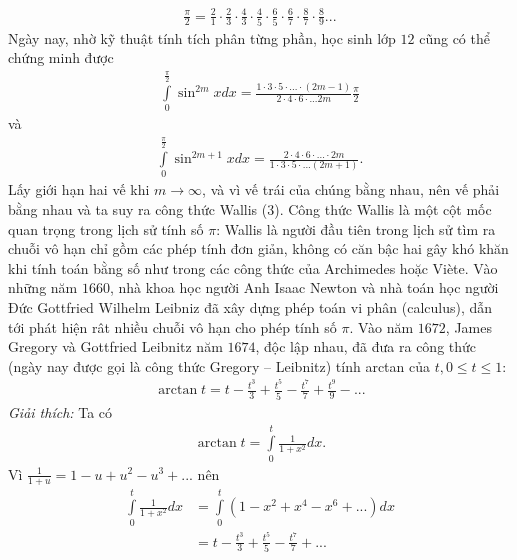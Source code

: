 \begin{multicols}{2}
	\begin{align*}
		\frac{\pi }{2} = \frac{2}{1} \cdot \frac{2}{3} \cdot \frac{4}{3} \cdot \frac{4}{5} \cdot \frac{6}{5} \cdot \frac{6}{7} \cdot \frac{8}{7} \cdot \frac{8}{9}... \tag{$3$}
	\end{align*}
	Ngày nay, nhờ kỹ thuật tính tích phân từng phần, học sinh lớp $12$ cũng có thể chứng minh được 
	\begin{align*}
		\int\limits_0^{\frac{\pi }{2}} {{{\sin }^{2m}}xdx = \frac{{1 \cdot 3 \cdot 5 \cdot ... \cdot \left( {2m - 1} \right)}}{{2 \cdot 4 \cdot 6 \cdot ...2m}}} \frac{\pi }{2}
	\end{align*}
	và
	\begin{align*}
		\int\limits_0^{\frac{\pi }{2}} {{{\sin }^{2m + 1}}xdx = \frac{{2 \cdot 4 \cdot 6 \cdot ... \cdot 2m}}{{1 \cdot 3 \cdot 5 \cdot ...\left( {2m + 1} \right)}}} .
	\end{align*}
	Lấy giới hạn hai vế khi $m \to \infty$, và vì vế trái của chúng bằng nhau, nên vế phải  bằng nhau và ta suy ra công thức Wallis ($3$).
	\vskip 0.1cm
	Công thức Wallis là một cột mốc quan trọng trong lịch sử tính số $\pi$: Wallis là người đầu tiên trong lịch sử tìm ra chuỗi vô hạn chỉ gồm các phép tính đơn giản, không có căn bậc hai gây khó khăn khi tính toán bằng số như trong các công thức của Archimedes hoặc Viète.  
	\vskip 0.1cm
	Vào những năm $1660$, nhà khoa học người Anh Isaac Newton  và nhà toán học người Đức Gottfried Wilhelm Leibniz đã xây dựng phép toán vi phân (calculus), dẫn tới phát hiện rât nhiều chuỗi vô hạn cho phép tính số $\pi$.
	\vskip 0.1cm  
	Vào năm $1672$, James Gregory và Gottfried Leibnitz năm $1674$, độc lập nhau, đã đưa ra công thức (ngày nay được gọi là công thức Gregory -- Leibnitz) tính arctan của  $t, 0 \le t\le 1$:
	\begin{align*}
		\arctan t = t - \frac{{{t^3}}}{3} + \frac{{{t^5}}}{5} - \frac{{{t^7}}}{7} + \frac{{{t^9}}}{9} - ... \tag{$4$}
	\end{align*}
	\textit{Giải thích:} Ta có 
	\begin{align*}
		\arctan t = \int\limits_0^t {\frac{1}{{1 + {x^2}}}dx} .
	\end{align*}
	Vì $\frac{1}{{1 + u}} = 1 - u + {u^2} - {u^3} + ...$   nên
	\begin{align*}
			\int\limits_0^t {\frac{1}{{1 + {x^2}}}dx}  &= \int\limits_0^t {\left( {1 - {x^2} + {x^4} - {x^6} + ...} \right)dx} \\
			&= t - \frac{{{t^3}}}{3} + \frac{{{t^5}}}{5} - \frac{{{t^7}}}{7} + ...
	\end{align*}

\end{multicols}
